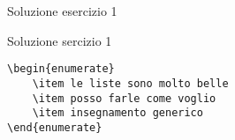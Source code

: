 \begin{frame}[fragile]{Soluzione esercizio 1}

\begin{block}{Soluzione sercizio 1}
\begin{lstlisting}
\begin{enumerate}
	\item le liste sono molto belle
	\item posso farle come voglio
	\item insegnamento generico
\end{enumerate}
\end{lstlisting}
\end{block}

\end{frame}
